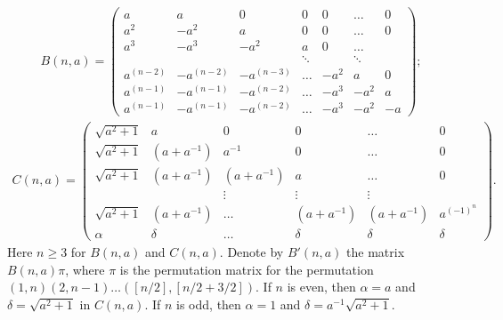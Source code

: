 \begin{gather*}
B(n,a) = \begin{pmatrix}
a         & a          & 0          & 0       &0     & \ldots & 0         \\
a^2       & -a^2       & a          & 0       &0     & \ldots & 0         \\
a^3       & -a^3       & -a^2       & a       &0     & \ldots &           \\
          &            &            &\ddots   &      &\ddots  &           \\
a^{(n-2)} & -a^{(n-2)} & -a^{(n-3)} & \ldots  & -a^2 & a      & 0         \\
a^{(n-1)} &-a^{(n-1)}  &-a^{(n-2)}  &\ldots   & -a^3 & -a^2   & a         \\
a^{(n-1)} &-a^{(n-1)}  &-a^{(n-2)}  &\ldots   & -a^3 & -a^2   & -a        
\end{pmatrix};
\end{gather*} 
\begin{gather*}
C(n,a) = \begin{pmatrix}
\sqrt{a^2+1}      & a      & 0          &   0   & \ldots & 0         \\
\sqrt{a^2+1}      & (a+a^{-1})      & a^{-1}          &   0   & \ldots &  0         \\
\sqrt{a^2+1}      & (a+a^{-1})      & (a+a^{-1})          &   a   & \ldots &  0        \\
                  &        & \vdots     &\vdots &\vdots  &           \\
\sqrt{a^2+1}      & (a+a^{-1})      & \ldots     &(a+a^{-1})      & (a+a^{-1})      &  a^{(-1)^{n}}     \\ 
\alpha     & \delta      & \ldots     &\delta & \delta      &  \delta 
\end{pmatrix}.
\end{gather*} 
Here $n\ge 3$ for $B(n,a)$ and $C(n,a).$ %
 Denote by $B'(n,a)$ the matrix $B(n,a)\pi$, where $\pi$ is the permutation matrix for the permutation $(1,n)(2,n-1) \ldots ([n/2], [n/2+3/2]).$ If $n$ is even, then $\alpha=a$ and $\delta=\sqrt{a^2+1}$ in $C(n,a).$ If $n$ is odd, then $\alpha=1$ and $\delta= a^{-1}\sqrt{a^2+1}.$



